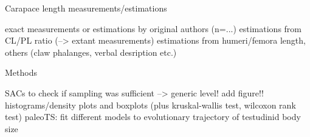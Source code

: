 \begin{frame}{Carapace length measurements/estimations}

\begin{itemize} %
	 exact measurements or estimations by original authors (n=...)
	\bigskip
	\p<2-> estimations from CL/PL ratio (--> extant measurements)
	\bigskip
	\p<3-> estimations from humeri/femora length, others (claw phalanges, verbal desription etc.)
\end{itemize}

\end{frame}

\begin{frame}{Methods}

\begin{itemize} %
	 SACs to check if sampling was sufficient --> generic level! add figure!!
	\bigskip
	\p<2-> histograms/density plots and boxplots (plus kruskal-wallis test, wilcoxon rank test)
	\bigskip
	\p<3-> paleoTS: fit different models to evolutionary trajectory of testudinid body size
\end{itemize}

\end{frame}